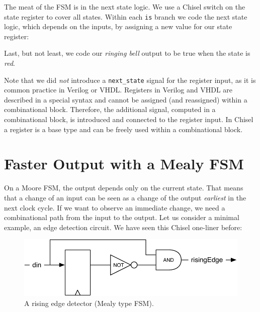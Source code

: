 \documentclass[%
    10pt,
    headinclude, footexclude,
    openright, %
    notitlepage,
    cleardoubleempty,
    headsepline,
    pointlessnumbers,
    bibtotoc, idxtotoc,
    ]{scrbook}
\newcommand{\code}[1]{{\small{\texttt{#1}}}}
\newcommand{\scale}{0.7}
\begin{document}

\noindent The meat of the FSM is in the next state logic. We use a Chisel switch on the
state register to cover all states. Within each \code{is} branch we code the next state
logic, which depends on the inputs, by assigning a new value for our state register:


\noindent Last, but not least, we code our \emph{ringing bell} output to be true when
the state is \emph{red}.


Note that we did \emph{not} introduce a \code{next\_state} signal for the register input,
as it is common practice in Verilog or VHDL.
Registers in Verilog and VHDL are described in a special syntax and cannot
be assigned (and reassigned) within a combinational block.
Therefore, the additional signal, computed in a combinational block, is
introduced and connected to the register input.
In Chisel a register is a base type and can be freely used within a combinational block.

\section{Faster Output with a Mealy FSM}

On a Moore FSM, the output depends only on the current state.
That means that a change of an input can be seen as a change of the
output \emph{earliest} in the next clock cycle.
If we want to observe an immediate change, we need a combinational
path from the input to the output.
Let us consider a minimal example, an edge detection circuit.
We have seen this Chisel one-liner before:


\begin{figure}
  \centering
  \includegraphics[scale=\scale]{figures/fsm-rising}
  \caption{A rising edge detector (Mealy type FSM).}
  \label{fig:fsm-rising}
\end{figure}
\end{document}
